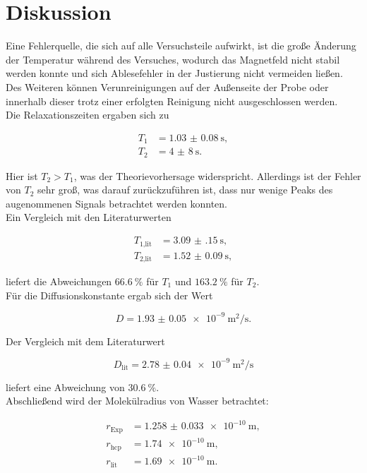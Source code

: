 \section{Diskussion}
\label{sec:Diskussion}


Eine Fehlerquelle, die sich auf alle Versuchsteile aufwirkt, ist die große Änderung der Temperatur während des Versuches,
wodurch das Magnetfeld nicht stabil werden konnte und sich Ablesefehler in der Justierung nicht vermeiden ließen. 
Des Weiteren können Verunreinigungen auf der Außenseite der Probe oder innerhalb dieser trotz einer erfolgten Reinigung 
nicht ausgeschlossen werden.\\
Die Relaxationszeiten ergaben sich zu 

\begin{align*}
    T_1 &= \SI{1.03(8)}{\second},\\
    T_2 &= \SI{4(8)}{\second}.
\end{align*}

Hier ist $T_2 > T_1$, was der Theorievorhersage widerspricht. Allerdings ist der Fehler von $T_2$ sehr groß, was darauf 
zurückzuführen ist, dass nur wenige Peaks des augenommenen Signals betrachtet werden konnten. \\
Ein Vergleich mit den Literaturwerten \cite{diff}

\begin{align*}
    T_\text{1,lit} &= \SI{3.09(15)}{\second},\\
    T_\text{2,lit} &= \SI{1.52(9)}{\second},
\end{align*}

liefert die Abweichungen $\SI{66.6}{\percent}$ für $T_1$ und $\SI{163.2}{\percent}$ für $T_2$.\\
Für die Diffusionskonstante ergab sich der Wert 

\begin{equation*}
    D = \SI{1.93(5)e-9}{\metre^2\per\second}.
\end{equation*}

Der Vergleich mit dem Literaturwert \cite{diff}

\begin{equation*}
    D_\text{lit} = \SI{2.78(4)e-9}{\metre^2\per\second}
\end{equation*}

liefert eine Abweichung von $\SI{30.6}{\percent}$.\\
Abschließend wird der Molekülradius von Wasser betrachtet: \cite{radius} 

\begin{align*}
    r_\text{Exp} &= \SI{1.258(33)e-10}{\metre},\\
    r_\text{hcp} &= \SI{1.74e-10}{\metre},\\
    r_\text{lit} &= \SI{1.69e-10}{\metre}.
\end{align*}

